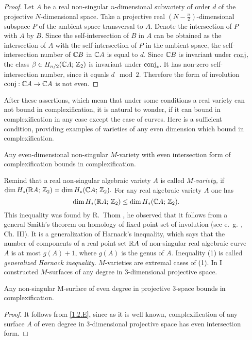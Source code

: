 \documentclass{article}
\numberwithin{equation}{section}
\begin{document}
\begin{proof} Let $A$ be a real non-singular $n$-dimensional subvariety of
order $d$ of the projective $N$-dimensional space. Take a projective real
$(N-\frac n2)$-dimensional subspace $P$ of the ambient space transversal
to $A$.
Denote the intersection of $P$ with $A$ by $B$. Since the self-intersection
of $B$ in $A$ can be obtained as the intersection of $A$ with the
self-intersection of $P$ in the ambient space, the self-intersection number
of $\mathbb C B$ in $\mathbb C A$ is equal to $d$. Since $\mathbb C B$ is invariant under $\operatorname{conj}$,
the class $\beta\in H_{n/2}(\mathbb C A;\,\mathbb Z_2)$  is invariant under $\operatorname{conj}_*$. It
has non-zero self-intersection number, since it equals $d\mod2$. Therefore
the form of involution $\operatorname{conj}:\mathbb C A\to\mathbb C A$ is not even. 
\end{proof}

After these assertions, which mean that under some conditions a real
variety can not bound in complexification, it is natural to wonder, if
it can bound in complexification in any case except the case of curves.
Here is a sufficient condition, providing examples of varieties of any
even dimension which bound in complexification.

\begin{thm}\label{1.2.E}
 Any even-dimensional non-singular $M$-variety
with even intersection form of complexification bounds in
complexification.  
\end{thm}

Remind that a real non-singular algebraic variety $A$ is called
{\it $M$-variety,\/} if $\dim H_*(\mathbb R A;\,\mathbb Z_2)=\dim H_*(\mathbb C A;\,\mathbb Z_2).$ For
any real algebraic variety $A$ one has
\begin{equation}\dim H_*(\mathbb R A;\,\mathbb Z_2)\le\dim H_*(\mathbb C A;\,\mathbb Z_2).\end{equation}
This inequality was found by R.~Thom \cite{Th}, he observed that it
follows from a general Smith's theorem on homology of fixed
point set of involution (see e.~g. \cite{Br}, Ch. III).
It is a generalization of Harnack's inequality, which says that the number
of components of a real point set $\mathbb R A$ of non-singular real algebraic curve
$A$ is at most $g(A)+1$, where $g(A)$ is the genus of $A$.
Inequality (1) is called {\it generalized Harnack inequality.\/}
$M$-varieties are extremal cases of (1). In \cite{V1} I constructed
$M$-surfaces of any degree in 3-dimensional projective space.

\begin{cor}\label{1.2.F}
 Any non-singular M-surface of even degree
in projective 3-space bounds in complexification.
\end{cor}
\begin{proof} It follows from \ref{1.2.E}, since as it is well
known, complexification of any surface $A$ of even degree in 3-dimensional
projective space has even intersection form. 
\end{proof}
\end{document}
